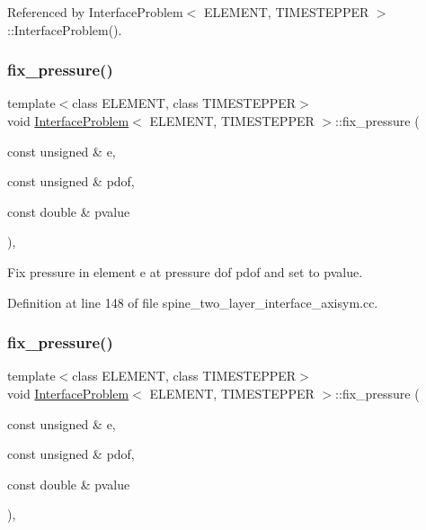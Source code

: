 Referenced by Interface\+Problem$<$ E\+L\+E\+M\+E\+N\+T, T\+I\+M\+E\+S\+T\+E\+P\+P\+E\+R $>$\+::\+Interface\+Problem().

\mbox{\label{classInterfaceProblem_a9d1a04da451b6f41336cb6f3bd910633}} 
\subsubsection{\texorpdfstring{fix\+\_\+pressure()}{fix\_pressure()}\hspace{0.1cm}{\footnotesize\ttfamily [1/2]}}
{\footnotesize\ttfamily template$<$class E\+L\+E\+M\+E\+NT, class T\+I\+M\+E\+S\+T\+E\+P\+P\+ER$>$ \\
void \hyperlink{classInterfaceProblem}{Interface\+Problem}$<$ E\+L\+E\+M\+E\+NT, T\+I\+M\+E\+S\+T\+E\+P\+P\+ER $>$\+::fix\+\_\+pressure (\begin{DoxyParamCaption}\item[{const unsigned \&}]{e,  }\item[{const unsigned \&}]{pdof,  }\item[{const double \&}]{pvalue }\end{DoxyParamCaption})\hspace{0.3cm}{\ttfamily [inline]}, {\ttfamily [private]}}



Fix pressure in element e at pressure dof pdof and set to pvalue. 



Definition at line 148 of file spine\+\_\+two\+\_\+layer\+\_\+interface\+\_\+axisym.\+cc.

\mbox{\label{classInterfaceProblem_a9d1a04da451b6f41336cb6f3bd910633}} 
\subsubsection{\texorpdfstring{fix\+\_\+pressure()}{fix\_pressure()}\hspace{0.1cm}{\footnotesize\ttfamily [2/2]}}
{\footnotesize\ttfamily template$<$class E\+L\+E\+M\+E\+NT, class T\+I\+M\+E\+S\+T\+E\+P\+P\+ER$>$ \\
void \hyperlink{classInterfaceProblem}{Interface\+Problem}$<$ E\+L\+E\+M\+E\+NT, T\+I\+M\+E\+S\+T\+E\+P\+P\+ER $>$\+::fix\+\_\+pressure (\begin{DoxyParamCaption}\item[{const unsigned \&}]{e,  }\item[{const unsigned \&}]{pdof,  }\item[{const double \&}]{pvalue }\end{DoxyParamCaption})\hspace{0.3cm}{\ttfamily [inline]}, {\ttfamily [private]}}



